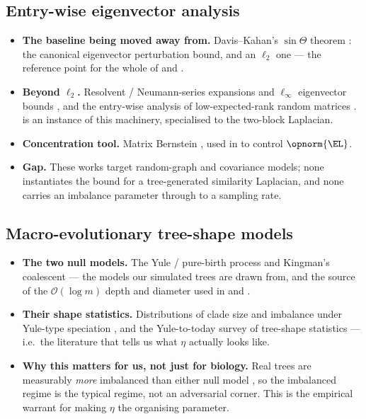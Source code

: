 \subsection*{Entry-wise eigenvector analysis}
\begin{itemize}[leftmargin=1.4em, itemsep=3pt, topsep=2pt]
  \item \textbf{The baseline being moved away from.} Davis--Kahan's $\sin\Theta$
        theorem \cite{davis1970rotation}: the canonical eigenvector perturbation
        bound, and an $\ell_2$ one --- the reference point for the whole of
         and .
  \item \textbf{Beyond $\ell_2$.} Resolvent / Neumann-series expansions and
        $\ell_\infty$ eigenvector bounds
        \cite{eldridge2017unperturbed, fan2018eigenvector}, and the entry-wise
        analysis of low-expected-rank random matrices
        \cite{abbe2020entrywise}.  is an instance of this
        machinery, specialised to the two-block Laplacian.
  \item \textbf{Concentration tool.} Matrix Bernstein
        \cite{tropp2012userfriendly}, used in  to control
        $\opnorm{\EL}$.
  \item \textbf{Gap.} These works target random-graph and covariance models; none
        instantiates the bound for a tree-generated similarity Laplacian, and none
        carries an imbalance parameter through to a sampling rate.
\end{itemize}

\subsection*{Macro-evolutionary tree-shape models}
\begin{itemize}[leftmargin=1.4em, itemsep=3pt, topsep=2pt]
  \item \textbf{The two null models.} The Yule / pure-birth process
        \cite{yule1925mathematical} and Kingman's coalescent
        \cite{kingman1982coalescent} --- the models our simulated trees are drawn
        from, and the source of the $\mathcal O(\log m)$ depth and diameter used
        in  and .
  \item \textbf{Their shape statistics.} Distributions of clade size and
        imbalance under Yule-type speciation \cite{steel2001properties}, and the
        Yule-to-today survey of tree-shape statistics \cite{aldous2001stochastic}
        --- i.e.\ the literature that tells us what $\eta$ actually looks like.
  \item \textbf{Why this matters for us, not just for biology.} Real trees are
        measurably \emph{more} imbalanced than either null model
        \cite{blum2006which}, so the imbalanced regime is the typical regime, not
        an adversarial corner. This is the empirical warrant for making $\eta$ the
        organising parameter.
\end{itemize}
